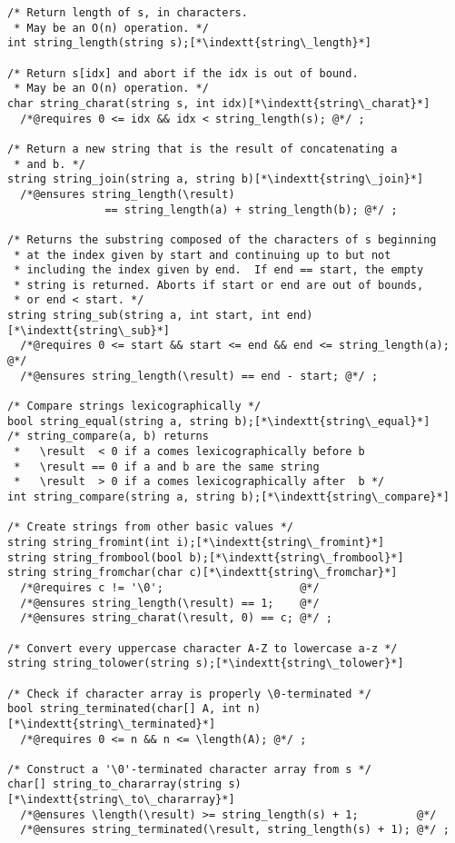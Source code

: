 \documentclass[11pt]{article}
\makeatletter
\newcommand{\indextt}[1]{\index{#1@\texttt{#1}}}
\makeatother
\begin{document}
\begin{lstlisting}
/* Return length of s, in characters.
 * May be an O(n) operation. */
int string_length(string s);[*\indextt{string\_length}*]

/* Return s[idx] and abort if the idx is out of bound.
 * May be an O(n) operation. */
char string_charat(string s, int idx)[*\indextt{string\_charat}*]
  /*@requires 0 <= idx && idx < string_length(s); @*/ ;

/* Return a new string that is the result of concatenating a
 * and b. */
string string_join(string a, string b)[*\indextt{string\_join}*]
  /*@ensures string_length(\result)
               == string_length(a) + string_length(b); @*/ ;

/* Returns the substring composed of the characters of s beginning
 * at the index given by start and continuing up to but not
 * including the index given by end.  If end == start, the empty
 * string is returned. Aborts if start or end are out of bounds,
 * or end < start. */
string string_sub(string a, int start, int end)[*\indextt{string\_sub}*]
  /*@requires 0 <= start && start <= end && end <= string_length(a); @*/
  /*@ensures string_length(\result) == end - start; @*/ ;

/* Compare strings lexicographically */
bool string_equal(string a, string b);[*\indextt{string\_equal}*]
/* string_compare(a, b) returns
 *   \result  < 0 if a comes lexicographically before b
 *   \result == 0 if a and b are the same string
 *   \result  > 0 if a comes lexicographically after  b */
int string_compare(string a, string b);[*\indextt{string\_compare}*]

/* Create strings from other basic values */
string string_fromint(int i);[*\indextt{string\_fromint}*]
string string_frombool(bool b);[*\indextt{string\_frombool}*]
string string_fromchar(char c)[*\indextt{string\_fromchar}*]
  /*@requires c != '\0';                     @*/
  /*@ensures string_length(\result) == 1;    @*/
  /*@ensures string_charat(\result, 0) == c; @*/ ;

/* Convert every uppercase character A-Z to lowercase a-z */
string string_tolower(string s);[*\indextt{string\_tolower}*]

/* Check if character array is properly \0-terminated */
bool string_terminated(char[] A, int n)[*\indextt{string\_terminated}*]
  /*@requires 0 <= n && n <= \length(A); @*/ ;

/* Construct a '\0'-terminated character array from s */
char[] string_to_chararray(string s)[*\indextt{string\_to\_chararray}*]
  /*@ensures \length(\result) >= string_length(s) + 1;         @*/
  /*@ensures string_terminated(\result, string_length(s) + 1); @*/ ;


\end{lstlisting}
\end{document}
